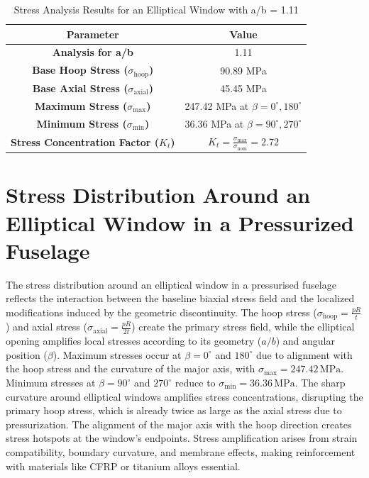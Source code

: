 \documentclass[a4paper,11pt]{article}
\begin{document}
 

\begin{table}[h!]
\centering
\renewcommand{\arraystretch}{1.3}
\begin{tabular}{|c|c|}
\hline
\textbf{Parameter}                      & \textbf{Value}                              \\ \hline
\textbf{Analysis for a/b}               & 1.11                                       \\ \hline
\textbf{Base Hoop Stress (\( \sigma_{\text{hoop}} \))} & 90.89 MPa                                 \\ \hline
\textbf{Base Axial Stress (\( \sigma_{\text{axial}} \))} & 45.45 MPa                                 \\ \hline
\textbf{Maximum Stress (\( \sigma_{\max} \))}        & 247.42 MPa at \( \beta = 0^\circ, 180^\circ \)     \\ \hline
\textbf{Minimum Stress (\( \sigma_{\min} \))}        & 36.36 MPa at \( \beta = 90^\circ, 270^\circ \)   \\ \hline
\textbf{Stress Concentration Factor\cite{peterson1974} (\( K_t \))} 
    & \( K_t = \frac{\sigma_{\text{max}}}{\sigma_{\text{nom}}} = 2.72 \) \\ \hline
\end{tabular}
\caption{Stress Analysis Results for an Elliptical Window with a/b = 1.11}
\label{tab:analysis_results}
\vspace{-15pt}
\end{table}
 
 
 \section{Stress Distribution Around an Elliptical Window in a Pressurized Fuselage}
 
The stress distribution around an elliptical window in a pressurised fuselage reflects the interaction between the baseline biaxial stress field and the localized modifications induced by the geometric discontinuity. The hoop stress (\(\sigma_{\text{hoop}} = \frac{pR}{t}\)) and axial stress (\(\sigma_{\text{axial}} = \frac{pR}{2t}\)) create the primary stress field, while the elliptical opening amplifies local stresses according to its geometry (\(a/b\)) and angular position (\(\beta\)). Maximum stresses occur at \(\beta = 0^\circ\) and \(180^\circ\) due to alignment with the hoop stress and the curvature of the major axis, with \(\sigma_{\text{max}} = 247.42 \, \text{MPa}\). Minimum stresses at \(\beta = 90^\circ\) and \(270^\circ\) reduce to \(\sigma_{\text{min}} = 36.36 \, \text{MPa}\). 
The sharp curvature around elliptical windows amplifies stress concentrations, disrupting the primary hoop stress, which is already twice as large as the axial stress due to pressurization. The alignment of the major axis with the hoop direction creates stress hotspots at the window's endpoints. Stress amplification arises from strain compatibility, boundary curvature, and membrane effects, making reinforcement with materials like CFRP or titanium alloys essential.  
\end{document}
